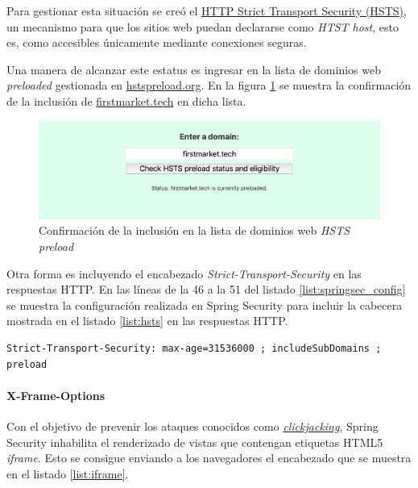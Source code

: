 \documentclass[a4paper]{article}
\begin{document}
	Para gestionar esta situación se creó el \href{https://tools.ietf.org/html/rfc6797}{HTTP Strict Transport Security (HSTS)}, un mecanismo para que los sitios web puedan declararse como \emph{HTST host}, esto es, como accesibles únicamente mediante conexiones seguras.
	
	Una manera de alcanzar este estatus es ingresar en la lista de dominios web \emph{preloaded} gestionada en \href{https://hstspreload.org/}{hstspreload.org}. En la figura \ref{fig:hsts_preload} se muestra la confirmación de la inclusión de \href{https://firstmarket.tech}{firstmarket.tech} en dicha lista.
	
	\begin{figure}[hbt!]
		\centering
		\includegraphics[width=\textwidth,keepaspectratio]{hsts_preload}
		\caption{Confirmación de la inclusión en la lista de dominios web \emph{HSTS preload}}
		\label{fig:hsts_preload}
	\end{figure}
	
	Otra forma es incluyendo el encabezado \emph{Strict-Transport-Security} en las respuestas HTTP. En las líneas de la 46 a la 51 del listado \ref{list:springsec_config} se muestra la configuración realizada en Spring Security para incluir la cabecera mostrada en el listado \ref{list:hsts} en las respuestas HTTP.
	\\
	
	\begin{lstlisting}[caption=Cabecera de declaración \emph{HSTS host}, label=list:hsts]
	 Strict-Transport-Security: max-age=31536000 ; includeSubDomains ; preload
	\end{lstlisting}
	
	\paragraph{X-Frame-Options}
	Con el objetivo de prevenir los ataques conocidos como \href{https://en.wikipedia.org/wiki/Clickjacking}{\emph{clickjacking}}, Spring Security inhabilita el renderizado de vistas que contengan etiquetas HTML5 \emph{iframe}. Esto se consigue enviando a los navegadores el encabezado que se muestra en el listado \ref{list:iframe}.
	\\
	
\end{document}
